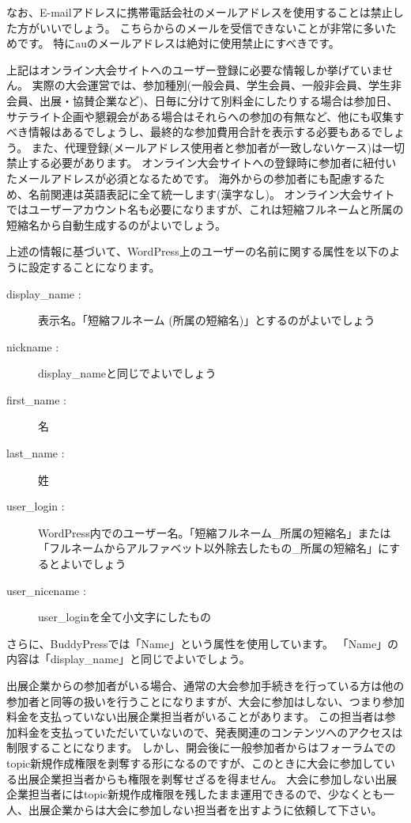 \documentclass[titlepage,10pt,a4paper,uplatex]{jsbook}
\begin{document}
なお、E-mailアドレスに携帯電話会社のメールアドレスを使用することは禁止した方がいいでしょう。
こちらからのメールを受信できないことが非常に多いためです。
特にauのメールアドレスは絶対に使用禁止にすべきです。

上記はオンライン大会サイトへのユーザー登録に必要な情報しか挙げていません。
実際の大会運営では、参加種別(一般会員、学生会員、一般非会員、学生非会員、出展・協賛企業など)、日毎に分けて別料金にしたりする場合は参加日、サテライト企画や懇親会がある場合はそれらへの参加の有無など、他にも収集すべき情報はあるでしょうし、最終的な参加費用合計を表示する必要もあるでしょう。
また、代理登録(メールアドレス使用者と参加者が一致しないケース)は一切禁止する必要があります。
オンライン大会サイトへの登録時に参加者に紐付いたメールアドレスが必須となるためです。
海外からの参加者にも配慮するため、名前関連は英語表記に全て統一します(漢字なし)。
オンライン大会サイトではユーザーアカウント名も必要になりますが、これは短縮フルネームと所属の短縮名から自動生成するのがよいでしょう。

上述の情報に基づいて、WordPress上のユーザーの名前に関する属性を以下のように設定することになります。

\begin{description}
\item[display\_name : ] 表示名。「短縮フルネーム (所属の短縮名)」とするのがよいでしょう
\item[nickname : ] display\_nameと同じでよいでしょう
\item[first\_name : ] 名
\item[last\_name : ] 姓
\item[user\_login : ] WordPress内でのユーザー名。「短縮フルネーム\_所属の短縮名」または「フルネームからアルファベット以外除去したもの\_所属の短縮名」にするとよいでしょう
\item[user\_nicename : ] user\_loginを全て小文字にしたもの
\end{description}

さらに、BuddyPressでは「Name」という属性を使用しています。
「Name」の内容は「display\_name」と同じでよいでしょう。

出展企業からの参加者がいる場合、通常の大会参加手続きを行っている方は他の参加者と同等の扱いを行うことになりますが、大会に参加はしない、つまり参加料金を支払っていない出展企業担当者がいることがあります。
この担当者は参加料金を支払っていただいていないので、発表関連のコンテンツへのアクセスは制限することになります。
しかし、開会後に一般参加者からはフォーラムでのtopic新規作成権限を剥奪する形になるのですが、このときに大会に参加している出展企業担当者からも権限を剥奪せざるを得ません。
大会に参加しない出展企業担当者にはtopic新規作成権限を残したまま運用できるので、少なくとも一人、出展企業からは大会に参加しない担当者を出すように依頼して下さい。
\end{document}
